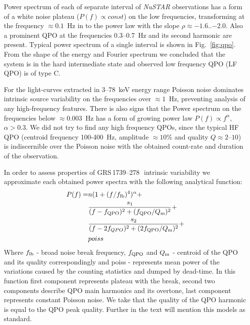 \documentclass[a4paper,fleqn,usenatbib]{mnras}
\def\grs{{GRS\,1739--278\,}}
\begin{document}

Power spectrum of each of separate interval of {\it NuSTAR} observations has a form of a white noise plateau ($P(f)\propto const$) on the low frequencies, transforming at the frequency $\approx0.1$~Hz in to the power law with the slope $\rho\approx-1.6$..$-2.0$. 
Also a prominent QPO at the frequencies 0.3--0.7~Hz and its second harmonic are present. 
Typical power spectrum of a single interval is shown in Fig.~\ref{fig:qpo}.
From the shape of the energy and Fourier spectrum we concluded that the system is in the hard intermediate state and observed low frequency QPO (LF QPO) is of type C. 

For the light-curves extracted in 3--78~keV energy range Poisson noise dominates intrinsic source variability on the frequencies over $\approx1$~Hz, preventing analysis of any high-frequency features.
There is also signs that the Power spectrum on the frequencies below $\approx0.003$~Hz has a form of growing power law $P(f)\propto f^{\alpha}$, $\alpha > 0.3$.
We did not try to find any high frequency QPOs, since the typical HF QPO (centroid frequency 100-400~Hz, amplitude $\approx10$\% and quality $Q\approx2$--$10$) is indiscernible over the Poisson noise with the obtained count-rate and duration of the observation.



In order to assess properties of \grs\ intrinsic variability we approximate each obtained power spectra with the following analytical function:
\begin{equation}
        \begin{aligned}
                P(f)  = & n (1 + (f/f_{\rm lb})^4)^{\alpha} + \\
                     &\frac{s_1}{(f - f_{\rm QPO})^2 + (f_{\rm QPO}/Q_{\rm m})^2} +\\
                        & \frac{s_2}{(f - 2f_{QPO})^2 + (2f_{\rm QPO}/Q_{\rm m})^2} + \\
                        & poiss
\end{aligned}
        \label{eq:complex_fit}
\end{equation}
Where $f_{\rm lb}$ - broad noise break frequency, $f_{\rm QPO}$ and $Q_{\rm m}$ - centroid of the QPO and its quality correspondingly and poiss - represents mean power of the variations caused by the counting statistics and dumped by dead-time.
In this function first component represents plateau with the break, second two components describe QPO main harmonics and its overtone, last component represents constant Poisson noise.
We take that the quality of the QPO harmonic is equal to the QPO peak quality.
Further in the text will mention this models as standard.
\end{document}

